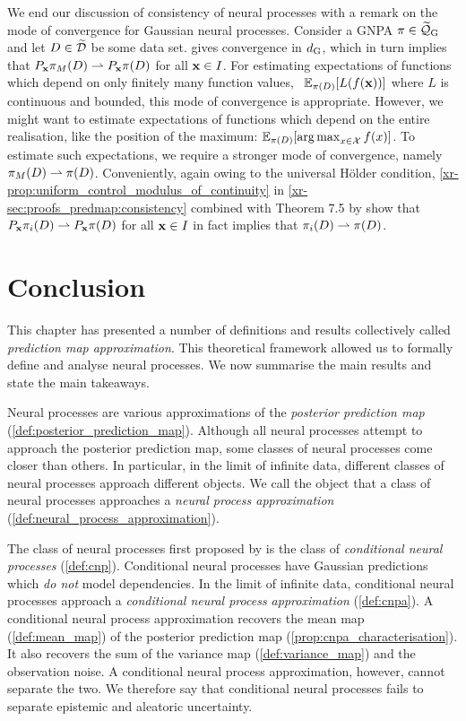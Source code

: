 \documentclass[12pt, twoside]{report}
\newcommand{\xrprefix}[1]{xr-#1}
\begin{document}
We end our discussion of consistency of neural processes with a remark on the mode of convergence for Gaussian neural processes.
Consider a GNPA $\pi \in \widetilde \Qc\ss{G}$ and
let $D \in \widetilde{\mathcal{D}}$ be some data set.
 gives convergence in $d\ss{G}$, which in turn implies that $P_{\mathbf{x}} \pi_M(D) \rightharpoonup P_{\mathbf{x}} \pi(D)$ for all $\mathbf{x} \in I$.
For estimating expectations of functions which depend on only finitely many function values, \eg~$\mathbb{E}_{\pi(D)}[L(f(\mathbf{x}))]$ where $L$ is continuous and bounded, this mode of convergence is appropriate.
However, we might want to estimate expectations of functions which depend on the entire realisation, like the position of the maximum: $\mathbb{E}_{\pi(D)}[\operatorname*{arg\,max}_{x \in \mathcal{X}} f(x)]$.
To estimate such expectations, we require a stronger mode of convergence, namely $\pi_M(D) \rightharpoonup \pi(D)$.
Conveniently, again owing to the universal H\"older condition, \cref{\xrprefix{prop:uniform_control_modulus_of_continuity}} in \cref{\xrprefix{sec:proofs_predmap:consistency}} combined with Theorem 7.5 by \textcite{Billingsley:1999:Convergence_of_Probability_Measures} show that
 $P_{\mathbf{x}} \pi_i(D) \rightharpoonup P_{\mathbf{x}} \pi(D)$ for all $\mathbf{x} \in I$ in fact implies that $\pi_i(D) \rightharpoonup \pi(D)$.

\section{Conclusion}

This chapter has presented a number of definitions and results collectively called \emph{prediction map approximation}.
This theoretical framework allowed us to formally define and analyse neural processes. 
We now summarise the main results and state the main takeaways.

Neural processes are various approximations of the \emph{posterior prediction map} (\cref{def:posterior_prediction_map}).
Although all neural processes attempt to approach the posterior prediction map, some classes of neural processes come closer than others.
In particular, in the limit of infinite data, different classes of neural processes approach different objects.
We call the object that a class of neural processes approaches a \emph{neural process approximation} (\cref{def:neural_process_approximation}).

The class of neural processes first proposed by \textcite{Garnelo:2018:Conditional_Neural_Processes} is the class of \emph{conditional neural processes} (\cref{def:cnp}).
Conditional neural processes have Gaussian predictions which \emph{do not} model dependencies.
In the limit of infinite data, conditional neural processes approach a \emph{conditional neural process approximation} (\cref{def:cnpa}).
A conditional neural process approximation recovers the mean map (\cref{def:mean_map}) of the posterior prediction map (\cref{prop:cnpa_characterisation}).
It also recovers the sum of the variance map (\cref{def:variance_map}) and the observation noise.
A conditional neural process approximation, however, cannot separate the two.
We therefore say that conditional neural processes fails to separate epistemic and aleatoric uncertainty.
\end{document}
